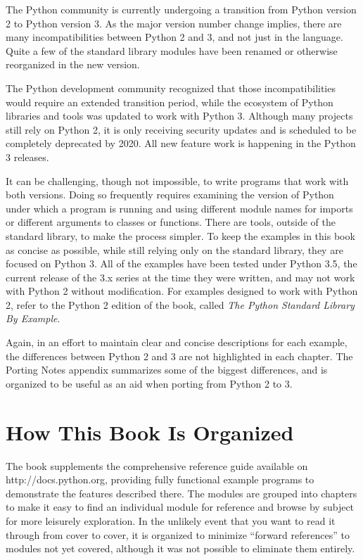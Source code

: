 The Python community is currently undergoing a transition from Python
version 2 to Python version 3. As the major version number change
implies, there are many incompatibilities between Python 2 and 3, and
not just in the language. Quite a few of the standard library modules
have been renamed or otherwise reorganized in the new version.

The Python development community recognized that those
incompatibilities would require an extended transition period, while
the ecosystem of Python libraries and tools was updated to work with
Python 3.  Although many projects still rely on Python 2, it is only
receiving security updates and is scheduled to be completely
deprecated by 2020. All new feature work is happening in the Python 3
releases.

It can be challenging, though not impossible, to write programs that
work with both versions. Doing so frequently requires examining the
version of Python under which a program is running and using different
module names for imports or different arguments to classes or
functions. There are tools, outside of the standard library, to make
the process simpler. To keep the examples in this book as concise as
possible, while still relying only on the standard library, they are
focused on Python 3.  All of the examples have been tested under
Python 3.5, the current release of the 3.x series at the time they
were written, and may not work with Python 2 without modification.
For examples designed to work with Python 2, refer to the Python 2
edition of the book, called \textit{The Python Standard Library By
  Example}.

Again, in an effort to maintain clear and concise descriptions for
each example, the differences between Python 2 and 3 are not
highlighted in each chapter. The Porting Notes appendix summarizes
some of the biggest differences, and is organized to be useful as an
aid when porting from Python 2 to 3.

\section*{How This Book Is Organized}

The book supplements the comprehensive reference guide available on
http://docs.python.org, providing fully functional example programs to
demonstrate the features described there. The modules are grouped into
chapters to make it easy to find an individual module for reference
and browse by subject for more leisurely exploration. In the unlikely
event that you want to read it through from cover to cover, it is
organized to minimize ``forward references'' to modules not yet
covered, although it was not possible to eliminate them entirely.

